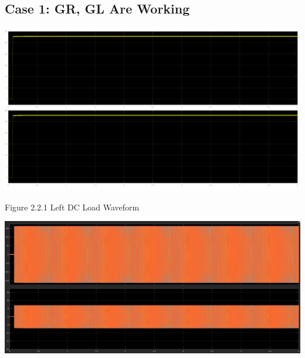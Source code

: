 \documentclass{mcmthesis}
\begin{document}
\subsection{Case 1: GR, GL Are Working}
\newlength{\imageheight}
\begin{center}
\includegraphics[trim= 0 0.28\imageheight{} 0 0, clip, width = 0.165\imageheight{}]{all_powered_load1.png}
\end{center}
\begin{center}
\small{Figure 2.2.1 Left DC Load Waveform}
\end{center}
\begin{center}
{\includegraphics[width=13.5cm]{ac.png}}
\end{center}
\end{document}
